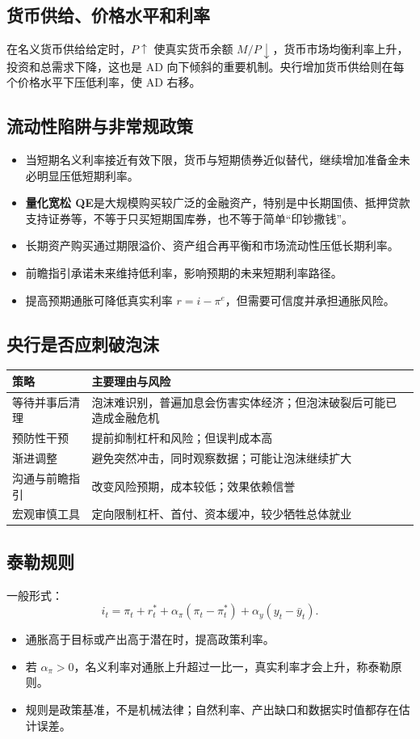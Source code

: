 \documentclass[UTF8,11pt,a4paper]{ctexart}
\newcommand{\term}[1]{\textbf{#1}}
\begin{document}
\subsection{货币供给、价格水平和利率}
在名义货币供给给定时，$P\uparrow$ 使真实货币余额 $M/P\downarrow$，货币市场均衡利率上升，投资和总需求下降，这也是 AD 向下倾斜的重要机制。央行增加货币供给则在每个价格水平下压低利率，使 AD 右移。

\subsection{流动性陷阱与非常规政策}
\begin{itemize}
  \item 当短期名义利率接近有效下限，货币与短期债券近似替代，继续增加准备金未必明显压低短期利率。
  \item \term{量化宽松 QE}是大规模购买较广泛的金融资产，特别是中长期国债、抵押贷款支持证券等，不等于只买短期国库券，也不等于简单“印钞撒钱”。
  \item 长期资产购买通过期限溢价、资产组合再平衡和市场流动性压低长期利率。
  \item 前瞻指引承诺未来维持低利率，影响预期的未来短期利率路径。
  \item 提高预期通胀可降低真实利率 $r=i-\pi^e$，但需要可信度并承担通胀风险。
\end{itemize}

\subsection{央行是否应刺破泡沫}
\begin{longtable}{p{}p{}}
\toprule
策略 & 主要理由与风险\\
\midrule
等待并事后清理 & 泡沫难识别，普遍加息会伤害实体经济；但泡沫破裂后可能已造成金融危机\\
预防性干预 & 提前抑制杠杆和风险；但误判成本高\\
渐进调整 & 避免突然冲击，同时观察数据；可能让泡沫继续扩大\\
沟通与前瞻指引 & 改变风险预期，成本较低；效果依赖信誉\\
宏观审慎工具 & 定向限制杠杆、首付、资本缓冲，较少牺牲总体就业\\
\bottomrule
\end{longtable}

\subsection{泰勒规则}
一般形式：
\[
i_t=\pi_t+r_t^*+\alpha_\pi(\pi_t-\pi_t^*)+\alpha_y(y_t-\bar y_t).
\]
\begin{itemize}
  \item 通胀高于目标或产出高于潜在时，提高政策利率。
  \item 若 $\alpha_\pi>0$，名义利率对通胀上升超过一比一，真实利率才会上升，称泰勒原则。
  \item 规则是政策基准，不是机械法律；自然利率、产出缺口和数据实时值都存在估计误差。
\end{itemize}
\end{document}
